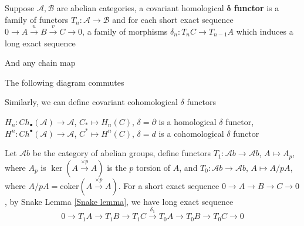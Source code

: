 \documentclass[../main.tex]{subfiles}
\begin{document}
\begin{definition}
Suppose $\mathscr A,\mathscr B$ are abelian categories, a covariant homological $\bm{\delta}$ \textbf{functor} is a family of functors $T_n:\mathscr A\to\mathscr B$ and for each short exact sequence $0\to A\xrightarrow{u} B\xrightarrow{v} C\to0$, a family of morphisms $\delta_n:T_nC\to T_{n-1}A$ which induces a long exact sequence
\begin{center}
\end{center}
And any chain map
\begin{center}
\end{center}
The following diagram commutes
\begin{center}
\end{center}
Similarly, we can define covariant cohomological $\delta$ functors
\end{definition}

\begin{example}
$H_n:Ch_\bullet(\mathscr A)\to\mathscr A$, $C_*\mapsto H_n(C)$, $\delta=\partial$ is a homological $\delta$ functor, $H^n:Ch^\bullet(\mathscr A)\to\mathscr A$, $C^*\mapsto H^n(C)$, $\delta=d$ is a cohomological $\delta$ functor
\end{example}

\begin{example}
Let $\mathscr Ab$ be the category of abelian groups, define functors $T_1:\mathscr Ab\to\mathscr Ab$, $A\mapsto A_p$, where $A_p$ is $\ker(A\xrightarrow{\times p}A)$ is the $p$ torsion of $A$, and $T_0:\mathscr Ab\to\mathscr Ab$, $A\mapsto A/pA$, where $A/pA=\mathrm{coker}(A\xrightarrow{\times p}A)$. For a short exact sequence $0\to A\to B\to C\to0$, by Snake Lemma \ref{Snake lemma}, we have long exact sequence
\[0\to T_1A\to T_1B\to T_1C\xrightarrow{\delta_1}T_0A\to T_0B\to T_0C\to 0\]
\end{example}
\end{document}
